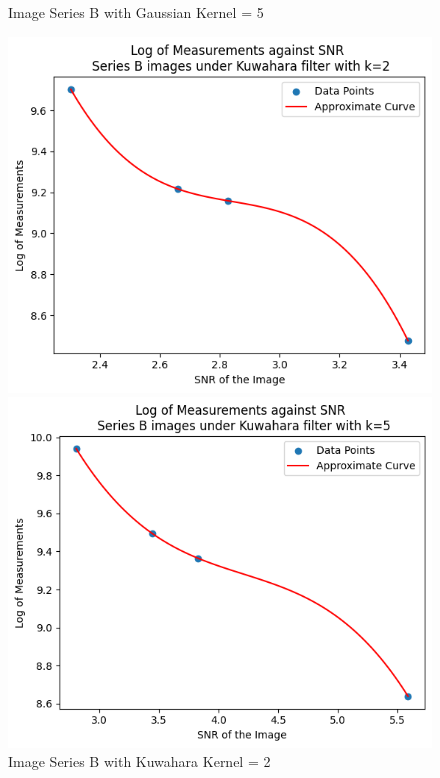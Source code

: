 \documentclass[runningheads]{llncs}
\begin{document}
\begin{figure}[h!]
\begin{minipage}[h]{0.47\linewidth}
\begin{center}
\caption{Image Series B with Gaussian Kernel = 5}
\label{SeriesB_Log_Gaussian_5}
\end{center}
\end{minipage}
\vfill
\vspace{0.2 cm}
\begin{minipage}[h]{0.47\linewidth}
\begin{center}
\includegraphics[width=1\linewidth]{Report/Result_Images/log_seriesB_Kuwahara_2.png} 
\caption{Image Series B with Kuwahara Kernel = 2}
\label{SeriesB_Log_Kuwahara_2}
\end{center}
\end{minipage}
\hfill
\begin{minipage}[h]{0.47\linewidth}
\begin{center}
\includegraphics[width=1\linewidth]{Report/Result_Images/log_seriesB_Kuwahara_5.png} 

\end{center}
\end{minipage}
\end{figure}
\end{document}
